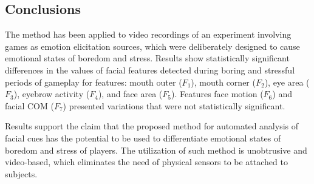 \subsection{Conclusions}

The method has been applied to video recordings of an experiment involving games as emotion elicitation sources, which were deliberately designed to cause emotional states of boredom and stress. Results show statistically significant differences in the values of facial features detected during boring and stressful periods of gameplay for features: mouth outer ($F_1$), mouth corner ($F_2$), eye area ($F_3$), eyebrow activity ($F_4$), and face area ($F_5$). Features face motion ($F_6$) and facial COM ($F_7$) presented variations that were not statistically significant.

Results support the claim that the proposed method for automated analysis of facial cues has the potential to be used to differentiate emotional states of boredom and stress of players. The utilization of such method is unobtrusive and video-based, which eliminates the need of physical sensors to be attached to subjects.

